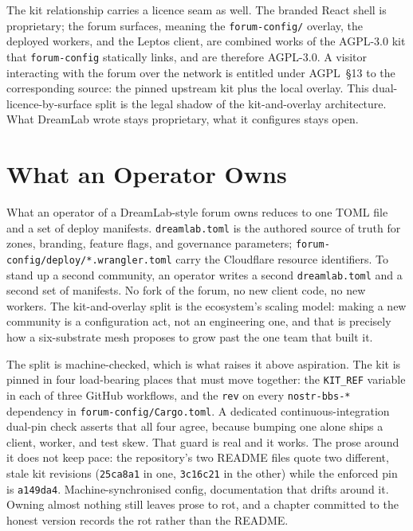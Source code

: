The kit relationship carries a licence seam as well. The branded React shell is proprietary; the forum surfaces, meaning the \texttt{forum-config/} overlay, the deployed workers, and the Leptos client, are combined works of the AGPL-3.0 kit that \texttt{forum-config} statically links, and are therefore AGPL-3.0. A visitor interacting with the forum over the network is entitled under AGPL~\S13 to the corresponding source: the pinned upstream kit plus the local overlay. This dual-licence-by-surface split is the legal shadow of the kit-and-overlay architecture. What DreamLab wrote stays proprietary, what it configures stays open.

\section{What an Operator Owns}

\begin{keyinsight}[title={A Community as a Configuration Act}]
What an operator of a DreamLab-style forum owns reduces to one TOML file and a set of deploy manifests. \texttt{dreamlab.toml} is the authored source of truth for zones, branding, feature flags, and governance parameters; \texttt{forum-config/deploy/*.wrangler.toml} carry the Cloudflare resource identifiers. To stand up a second community, an operator writes a second \texttt{dreamlab.toml} and a second set of manifests. No fork of the forum, no new client code, no new workers. The kit-and-overlay split is the ecosystem's scaling model: making a new community is a configuration act, not an engineering one, and that is precisely how a six-substrate mesh proposes to grow past the one team that built it.
\end{keyinsight}

The split is machine-checked, which is what raises it above aspiration. The kit is pinned in four load-bearing places that must move together: the \texttt{KIT\_REF} variable in each of three GitHub workflows, and the \texttt{rev} on every \texttt{nostr-bbs-*} dependency in \texttt{forum-config/Cargo.toml}. A dedicated continuous-integration dual-pin check asserts that all four agree, because bumping one alone ships a client, worker, and test skew. That guard is real and it works. The prose around it does not keep pace: the repository's two README files quote two different, stale kit revisions (\texttt{25ca8a1} in one, \texttt{3c16c21} in the other) while the enforced pin is \texttt{a149da4}. Machine-synchronised config, documentation that drifts around it. Owning almost nothing still leaves prose to rot, and a chapter committed to the honest version records the rot rather than the README.

